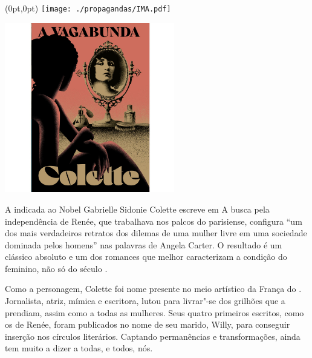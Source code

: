 \pagestyle{ima}
\label{ima}

\begin{textblock*}{5.625in}(0pt,0pt)%
\vspace*{-3.5cm}
\hspace*{-2.77cm}\texttt{[image: ./propagandas/IMA.pdf]}
\end{textblock*}

\pagebreak %

\begin{center}
\hspace*{.5cm}\includegraphics[width=74mm]{./grid/vagabond.jpg}
\end{center}

\hspace*{-7cm}\hrulefill\hspace*{-7cm}

\medskip

\noindent{}A indicada ao Nobel Gabrielle Sidonie Colette escreve em {}  A busca pela independência de Renée, que trabalhava nos palcos do {} parisiense, configura “um dos mais verdadeiros retratos dos dilemas de uma mulher livre em uma sociedade dominada pelos homens” nas palavras de Angela Carter. O resultado é um clássico absoluto e um dos romances que melhor caracterizam a condição do feminino, não só do século .

Como a personagem, Colette foi nome presente no meio artístico da França do . Jornalista, atriz, mímica e escritora, lutou para livrar"-se dos grilhões que a prendiam, assim como a todas as mulheres. Seus quatro primeiros escritos, como os de Renée, foram publicados no nome de seu marido, Willy, para conseguir inserção nos círculos literários. Captando permanências e transformações, {} ainda tem muito a dizer a todas, e todos, nós.

